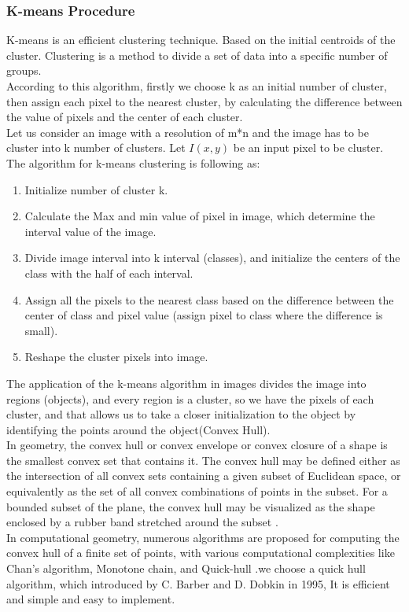\subsubsection*{K-means Procedure}
K-means is an efficient clustering technique. Based on the initial centroids of the
cluster. Clustering is a method to divide a set of data into a specific number of
groups.\\
According to this algorithm, firstly we choose k as an initial number of cluster, then
assign each pixel to the nearest cluster, by calculating the difference between the
value of pixels and the center of each cluster.\\
Let us consider an image with a resolution of m*n and the image has to be cluster
into k number of clusters. Let $I(x, y)$ be an input pixel to be cluster. The algorithm for
k-means clustering is following as:
\begin{enumerate}
    \item Initialize number of cluster k.
    \item Calculate the Max and min value of pixel in image, which determine the
    interval value of the image.
    \item Divide image interval into k interval (classes), and initialize the centers of the
    class with the half of each interval.
    \item Assign all the pixels to the nearest class based on the difference between the
    center of class and pixel value (assign pixel to class where the difference is
    small).
    \item Reshape the cluster pixels into image.
\end{enumerate}
The application of the k-means algorithm in images divides the image into regions
(objects), and every region is a cluster, so we have the pixels of each cluster, and that
allows us to take a closer initialization to the object by identifying the points around
the object(Convex Hull).\\
In geometry, the convex hull or convex envelope or convex closure of a shape is the
smallest convex set that contains it. The convex hull may be defined either as the
intersection of all convex sets containing a given subset of Euclidean space, or
equivalently as the set of all convex combinations of points in the subset. For
a bounded subset of the plane, the convex hull may be visualized as the shape
enclosed by a rubber band stretched around the subset \cite{3.1}.\\
In computational geometry, numerous algorithms are proposed for computing
the convex hull of a finite set of points, with various computational complexities
like Chan's algorithm, Monotone chain, and Quick-hull .we choose a quick hull
algorithm, which introduced by C. Barber and D. Dobkin in 1995, It is efficient and
simple and easy to implement.
